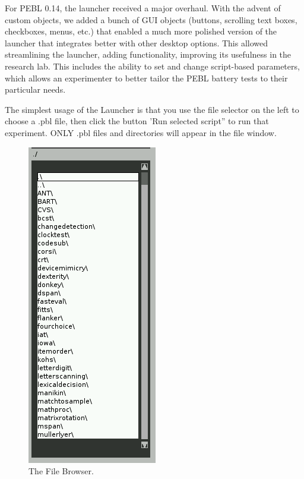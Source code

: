 For PEBL 0.14, the launcher received a major overhaul.  With the advent of custom objects, we added a bunch of GUI objects (buttons, scrolling text boxes, checkboxes, menus, etc.) that enabled a much more polished version of the launcher that integrates better with other desktop options.  This allowed streamlining the launcher, adding functionality, improving its usefulness in the research lab. This includes the ability to set and change script-based parameters, which allows an experimenter to better tailor the PEBL battery tests to their particular needs.

The simplest usage of the Launcher is that you use the file selector on
the left to choose a .pbl file, then click the button 'Run selected
script'' to run that experiment.  ONLY .pbl files and directories will
appear in the file window.
\clearpage
{}

\begin{figure}
 \vspace{-40pt}
  \begin{center}
    \includegraphics[scale=.5]{images/filebrowser.png} 
  \end{center}
  \caption{The File Browser.}
 \vspace{-40pt}
\end{figure}
